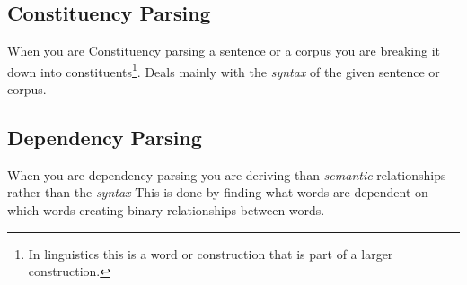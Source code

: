 \subsection{Constituency Parsing}
When you are Constituency parsing a sentence or a corpus you are breaking it down into constituents\footnote{In linguistics this is a word or construction that is part of a larger construction.}.
Deals mainly with the \emph{syntax} of the given sentence or corpus.
\subsection{Dependency Parsing}
When you are dependency parsing you are deriving than \emph{semantic} relationships rather than the \emph{syntax}
This is done by finding what words are dependent on which words creating binary relationships between words.
